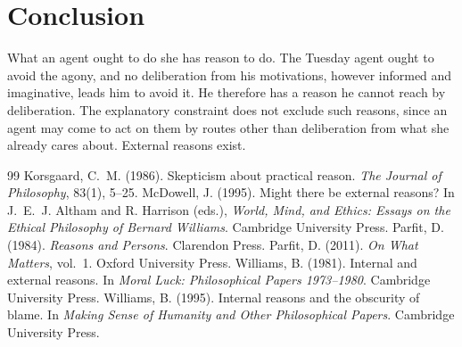 \documentclass{situationist-preprint}
\begin{document}
\section{Conclusion}

What an agent ought to do she has reason to do. The Tuesday agent ought to avoid the agony, and no deliberation from his motivations, however informed and imaginative, leads him to avoid it. He therefore has a reason he cannot reach by deliberation. The explanatory constraint does not exclude such reasons, since an agent may come to act on them by routes other than deliberation from what she already cares about. External reasons exist.

\begin{thebibliography}{99}\small
{} Korsgaard, C.~M. (1986). Skepticism about practical reason. \emph{The Journal of Philosophy}, 83(1), 5--25.
 McDowell, J. (1995). Might there be external reasons? In J.~E.~J. Altham and R. Harrison (eds.), \emph{World, Mind, and Ethics: Essays on the Ethical Philosophy of Bernard Williams}. Cambridge University Press.
 Parfit, D. (1984). \emph{Reasons and Persons}. Clarendon Press.
 Parfit, D. (2011). \emph{On What Matters}, vol.~1. Oxford University Press.
 Williams, B. (1981). Internal and external reasons. In \emph{Moral Luck: Philosophical Papers 1973--1980}. Cambridge University Press.
 Williams, B. (1995). Internal reasons and the obscurity of blame. In \emph{Making Sense of Humanity and Other Philosophical Papers}. Cambridge University Press.
\end{thebibliography}
\end{document}
